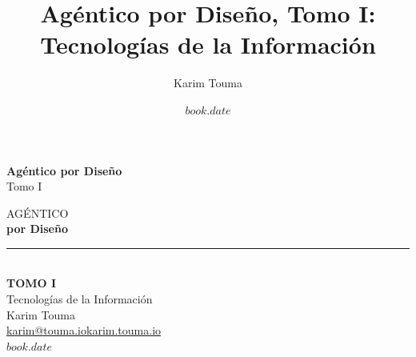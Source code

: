 \documentclass[$if(classoption)$$for(classoption)$$classoption$$sep$,$endfor$$endif$]{paradigma-agentico}
\title{Agéntico por Diseño, Tomo I: Tecnologías de la Información}
\author{Karim Touma}
\date{$book.date$}
\begin{document}
\frontmatter
\pagestyle{empty}

\vspace*{\fill}
\begin{center}
  {\fontsize{28}{34}\selectfont\sffamily\bfseries\color{pa-primary}Agéntico por Diseño}\\[12pt]
  {\fontsize{16}{20}\selectfont\sffamily\color{pa-midgray}Tomo I}
\end{center}
\vspace*{\fill}
\clearpage

\vspace*{0.18\textheight}
\begin{center}
  {\fontsize{13}{16}\selectfont\sffamily\color{pa-midgray}\MakeUppercase{Agéntico}}\\[0.8em]
  {\fontsize{34}{40}\selectfont\sffamily\bfseries\color{pa-primary}por Diseño}\\[1.2em]
  {\color{pa-primary}\rule{0.45\textwidth}{2pt}}\\[1.2em]
  {\fontsize{14}{18}\selectfont\sffamily\bfseries\color{pa-secondary}TOMO I}\\[0.8em]
  {\fontsize{18}{22}\selectfont\sffamily\color{pa-darktext}Tecnologías de la Información}\\[2.5em]
  {\fontsize{13}{16}\selectfont\sffamily\color{pa-midgray}Karim Touma}\\[0.6em]
  {\fontsize{10}{13}\selectfont\sffamily\color{pa-midgray}\href{mailto:karim@touma.io}{karim@touma.io}\enspace\textbar\enspace\href{https://karim.touma.io}{karim.touma.io}}\\[0.8em]
  {\fontsize{11}{14}\selectfont\sffamily\color{pa-midgray}$book.date$}
\end{center}
\vspace*{\fill}
\clearpage
\end{document}
